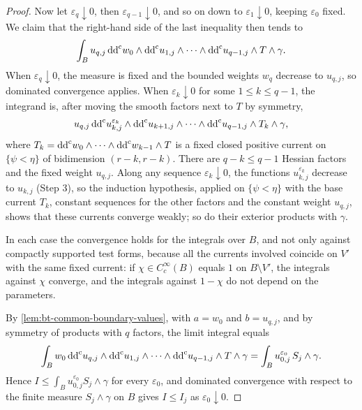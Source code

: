 \begin{proof}
Now let $\varepsilon_q\downarrow0$, then $\varepsilon_{q-1}\downarrow0$, and so on down to $\varepsilon_1\downarrow0$, keeping $\varepsilon_0$ fixed. We claim that the right-hand side of the last inequality then tends to
\[
 \int_Bu_{q,j}\,\mathrm{dd}^{\mathrm{c}} w_0\wedge\mathrm{dd}^{\mathrm{c}} u_{1,j}\wedge\cdots\wedge\mathrm{dd}^{\mathrm{c}} u_{q-1,j}\wedge T\wedge\gamma.
\]
When $\varepsilon_q\downarrow0$, the measure is fixed and the bounded weights $w_q$ decrease to $u_{q,j}$, so dominated convergence applies. When $\varepsilon_k\downarrow0$ for some $1\le k\le q-1$, the integrand is, after moving the smooth factors next to $T$ by symmetry,
\[
 u_{q,j}\,\mathrm{dd}^{\mathrm{c}} u^{\varepsilon_k}_{k,j}\wedge\mathrm{dd}^{\mathrm{c}} u_{k+1,j}\wedge\cdots\wedge\mathrm{dd}^{\mathrm{c}} u_{q-1,j}\wedge T_k\wedge\gamma,
\]
where $T_k=\mathrm{dd}^{\mathrm{c}} w_0\wedge\cdots\wedge\mathrm{dd}^{\mathrm{c}} w_{k-1}\wedge T$ is a fixed closed positive current on $\{\psi<\eta\}$ of bidimension $(r-k,r-k)$. There are $q-k\le q-1$ Hessian factors and the fixed weight $u_{q,j}$. Along any sequence $\varepsilon_k\downarrow0$, the functions $u^{\varepsilon_k}_{k,j}$ decrease to $u_{k,j}$ (Step 3), so the induction hypothesis, applied on $\{\psi<\eta\}$ with the base current $T_k$, constant sequences for the other factors and the constant weight $u_{q,j}$, shows that these currents converge weakly; so do their exterior products with $\gamma$.

In each case the convergence holds for the integrals over $B$, and not only against compactly supported test forms, because all the currents involved coincide on $V'$ with the same fixed current: if $\chi\in C^\infty_c(B)$ equals $1$ on $B\setminus V'$, the integrals against $\chi$ converge, and the integrals against $1-\chi$ do not depend on the parameters.

By \cref{lem:bt-common-boundary-values}, with $a=w_0$ and $b=u_{q,j}$, and by symmetry of products with $q$ factors, the limit integral equals
\[
 \int_Bw_0\,\mathrm{dd}^{\mathrm{c}} u_{q,j}\wedge\mathrm{dd}^{\mathrm{c}} u_{1,j}\wedge\cdots\wedge\mathrm{dd}^{\mathrm{c}} u_{q-1,j}\wedge T\wedge\gamma
 =\int_Bu^{\varepsilon_0}_{0,j}\,S_j\wedge\gamma.
\]
Hence $I\le\int_Bu^{\varepsilon_0}_{0,j}S_j\wedge\gamma$ for every $\varepsilon_0$, and dominated convergence with respect to the finite measure $S_j\wedge\gamma$ on $B$ gives $I\le I_j$ as $\varepsilon_0\downarrow0$.


\end{proof}
